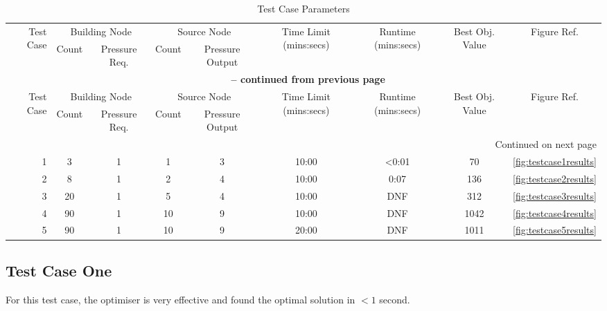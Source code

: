 \begin{landscape}
\begin{longtable}{r cc cc c c c c}
\caption{Test Case Parameters}\label{table:testcases} \\
\toprule
\multirow{2}{*}{Test Case} 
& \multicolumn{2}{c}{Building Node} 
& \multicolumn{2}{c}{Source Node} 
& \multirow{2}{*}{Time Limit (mins:secs)} 
& \multirow{2}{*}{Runtime (mins:secs)} 
& \multirow{2}{*}{Best Obj. Value} 
& \multirow{2}{*}{Figure Ref.} \\
\cmidrule(lr){2-3} \cmidrule(lr){4-5}
& Count & Pressure Req. & Count & Pressure Output & & & \\
\midrule
\endfirsthead

\multicolumn{9}{c}{{\bfseries \tablename\ \thetable{} -- continued from previous page}} \\
\toprule
\multirow{2}{*}{Test Case} 
& \multicolumn{2}{c}{Building Node} 
& \multicolumn{2}{c}{Source Node} 
& \multirow{2}{*}{Time Limit (mins:secs)}
& \multirow{2}{*}{Runtime (mins:secs)}
& \multirow{2}{*}{Best Obj. Value} 
& \multirow{2}{*}{Figure Ref.} \\
\cmidrule(lr){2-3} \cmidrule(lr){4-5}
& Count & Pressure Req. & Count & Pressure Output & & & \\
\midrule
\endhead

\midrule \multicolumn{9}{r}{{Continued on next page}} \\
\endfoot

\bottomrule
\endlastfoot

1 & 3 & 1 & 1 & 3 & 10:00 & <0:01 & 70 & \ref{fig:testcase1results} \\
2 & 8 & 1 & 2 & 4 & 10:00 & 0:07 & 136 & \ref{fig:testcase2results} \\
3 & 20 & 1 & 5 & 4 & 10:00 & DNF & 312 & \ref{fig:testcase3results} \\
4 & 90 & 1 & 10 & 9 & 10:00 & DNF & 1042 & \ref{fig:testcase4results} \\
5 & 90 & 1 & 10 & 9 & 20:00 & DNF & 1011 & \ref{fig:testcase5results} \\

\end{longtable}
\end{landscape}


\subsection{Test Case One}
For this test case, the optimiser is very effective and found the optimal solution in $<1$ second.


